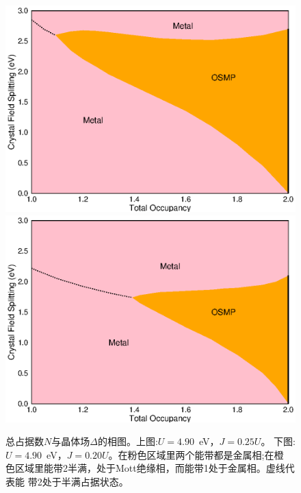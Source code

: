 \begin{figure}
\centering
\includegraphics{figure/phase1.eps}
\includegraphics{figure/phase2.eps}
\caption[总占据数$N$与晶体场$\Delta$的相图]
        {总占据数$N$与晶体场$\Delta$的相图。上图:$U=4.90$\ eV，$J=0.25U$。
         下图:$U=4.90$\ eV，$J=0.20U$。在粉色区域里两个能带都是金属相;在橙
         色区域里能带2半满，处于Mott绝缘相，而能带1处于金属相。虚线代表能
         带2处于半满占据状态。} 
\label{fig:phase}
\end{figure}


